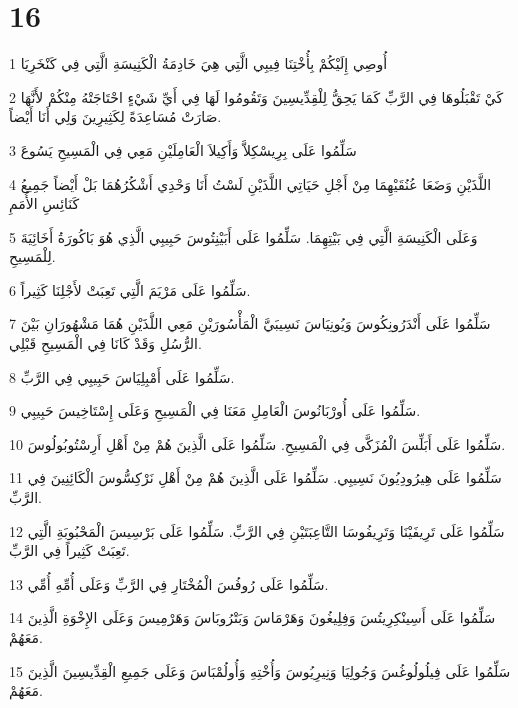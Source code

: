 \chapter{16}

\par 1 أُوصِي إِلَيْكُمْ بِأُخْتِنَا فِيبِي الَّتِي هِيَ خَادِمَةُ الْكَنِيسَةِ الَّتِي فِي كَنْخَرِيَا
\par 2 كَيْ تَقْبَلُوهَا فِي الرَّبِّ كَمَا يَحِقُّ لِلْقِدِّيسِينَ وَتَقُومُوا لَهَا فِي أَيِّ شَيْءٍ احْتَاجَتْهُ مِنْكُمْ لأَنَّهَا صَارَتْ مُسَاعِدَةً لِكَثِيرِينَ وَلِي أَنَا أَيْضاً.
\par 3 سَلِّمُوا عَلَى بِرِيسْكِلاَّ وَأَكِيلاَ الْعَامِلَيْنِ مَعِي فِي الْمَسِيحِ يَسُوعَ
\par 4 اللَّذَيْنِ وَضَعَا عُنُقَيْهِمَا مِنْ أَجْلِ حَيَاتِي اللَّذَيْنِ لَسْتُ أَنَا وَحْدِي أَشْكُرُهُمَا بَلْ أَيْضاً جَمِيعُ كَنَائِسِ الأُمَمِ
\par 5 وَعَلَى الْكَنِيسَةِ الَّتِي فِي بَيْتِهِمَا. سَلِّمُوا عَلَى أَبَيْنِتُوسَ حَبِيبِي الَّذِي هُوَ بَاكُورَةُ أَخَائِيَةَ لِلْمَسِيحِ.
\par 6 سَلِّمُوا عَلَى مَرْيَمَ الَّتِي تَعِبَتْ لأَجْلِنَا كَثِيراً.
\par 7 سَلِّمُوا عَلَى أَنْدَرُونِكُوسَ وَيُونِيَاسَ نَسِيبَيَّ الْمَأْسُورَيْنِ مَعِي اللَّذَيْنِ هُمَا مَشْهُورَانِ بَيْنَ الرُّسُلِ وَقَدْ كَانَا فِي الْمَسِيحِ قَبْلِي.
\par 8 سَلِّمُوا عَلَى أَمْبِلِيَاسَ حَبِيبِي فِي الرَّبِّ.
\par 9 سَلِّمُوا عَلَى أُورْبَانُوسَ الْعَامِلِ مَعَنَا فِي الْمَسِيحِ وَعَلَى إِسْتَاخِيسَ حَبِيبِي.
\par 10 سَلِّمُوا عَلَى أَبَلِّسَ الْمُزَكَّى فِي الْمَسِيحِ. سَلِّمُوا عَلَى الَّذِينَ هُمْ مِنْ أَهْلِ أَرِسْتُوبُولُوسَ.
\par 11 سَلِّمُوا عَلَى هِيرُودِيُونَ نَسِيبِي. سَلِّمُوا عَلَى الَّذِينَ هُمْ مِنْ أَهْلِ نَرْكِسُّوسَ الْكَائِنِينَ فِي الرَّبِّ.
\par 12 سَلِّمُوا عَلَى تَرِيفَيْنَا وَتَرِيفُوسَا التَّاعِبَتَيْنِ فِي الرَّبِّ. سَلِّمُوا عَلَى بَرْسِيسَ الْمَحْبُوبَةِ الَّتِي تَعِبَتْ كَثِيراً فِي الرَّبِّ.
\par 13 سَلِّمُوا عَلَى رُوفُسَ الْمُخْتَارِ فِي الرَّبِّ وَعَلَى أُمِّهِ أُمِّي.
\par 14 سَلِّمُوا عَلَى أَسِينْكِرِيتُسَ وَفِلِيغُونَ وَهَرْمَاسَ وَبَتْرُوبَاسَ وَهَرْمِيسَ وَعَلَى الإِخْوَةِ الَّذِينَ مَعَهُمْ.
\par 15 سَلِّمُوا عَلَى فِيلُولُوغُسَ وَجُولِيَا وَنِيرِيُوسَ وَأُخْتِهِ وَأُولُمْبَاسَ وَعَلَى جَمِيعِ الْقِدِّيسِينَ الَّذِينَ مَعَهُمْ.

